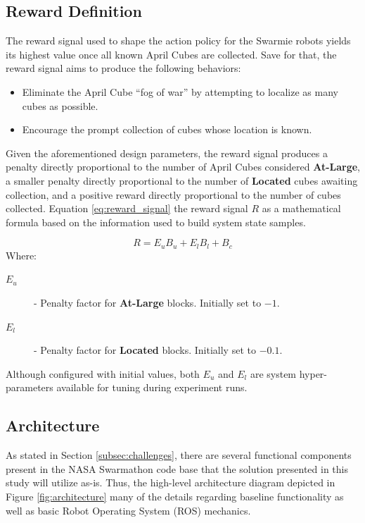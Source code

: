 \documentclass[sigconf,authordraft]{acmart}
\begin{document}
\subsection{Reward Definition}\label{subsec:reward_signal}
The reward signal used to shape the action policy for the Swarmie robots yields its highest value once all known April Cubes are collected. Save for that, the reward signal aims to produce the following behaviors:

\begin{itemize}
  \item Eliminate the April Cube ``fog of war'' by attempting to localize as many cubes as possible.
  \item Encourage the prompt collection of cubes whose location is known.
\end{itemize}

Given the aforementioned design parameters, the reward signal produces a penalty directly proportional to the number of April Cubes considered \textbf{At-Large}, a smaller penalty directly proportional to the number of \textbf{Located} cubes awaiting collection, and a positive reward directly proportional to the number of cubes collected. Equation \ref{eq:reward_signal} the reward signal $R$ as a mathematical formula based on the information used to build system state samples.

\begin{equation}\label{eq:reward_signal}
  R = E_uB_u + E_lB_l + B_c
\end{equation}
Where:
\begin{description}
  \item[$E_u$] - Penalty factor for \textbf{At-Large} blocks. Initially set to $-1$.
  \item[$E_l$] - Penalty factor for \textbf{Located} blocks. Initially set to $-0.1$. 
\end{description}

Although configured with initial values, both $E_u$ and $E_l$ are system hyper-parameters available for tuning during experiment runs.

\subsection{Architecture}\label{subsec:architecture}
As stated in Section \ref{subsec:challenges}, there are several functional components present in the NASA Swarmathon code base that the solution presented in this study will utilize as-is. Thus, the high-level architecture diagram depicted in Figure \ref{fig:architecture} many of the details regarding baseline functionality as well as basic Robot Operating System (ROS) mechanics.
\end{document}
